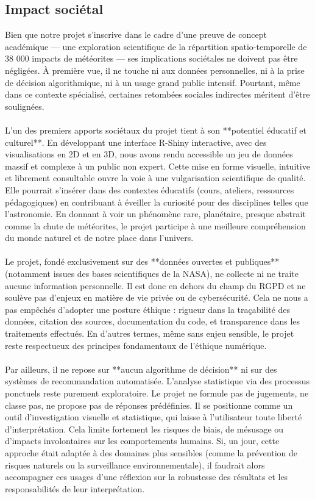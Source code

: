 \documentclass[12pt]{article}
\begin{document}
\subsection{Impact sociétal}
Bien que notre projet s’inscrive dans le cadre d’une preuve de concept académique — une exploration scientifique de la répartition spatio-temporelle de 38 000 impacts de météorites — ses implications sociétales ne doivent pas être négligées. À première vue, il ne touche ni aux données personnelles, ni à la prise de décision algorithmique, ni à un usage grand public intensif. Pourtant, même dans ce contexte spécialisé, certaines retombées sociales indirectes méritent d’être soulignées.\\
\\
L’un des premiers apports sociétaux du projet tient à son **potentiel éducatif et culturel**. En développant une interface R-Shiny interactive, avec des visualisations en 2D et en 3D, nous avons rendu accessible un jeu de données massif et complexe à un public non expert. Cette mise en forme visuelle, intuitive et librement consultable ouvre la voie à une vulgarisation scientifique de qualité. Elle pourrait s’insérer dans des contextes éducatifs (cours, ateliers, ressources pédagogiques) en contribuant à éveiller la curiosité pour des disciplines telles que l’astronomie. En donnant à voir un phénomène rare, planétaire, presque abstrait comme la chute de météorites, le projet participe à une meilleure compréhension du monde naturel et de notre place dans l’univers.\\
\\
Le projet, fondé exclusivement sur des **données ouvertes et publiques** (notamment issues des bases scientifiques de la NASA), ne collecte ni ne traite aucune information personnelle. Il est donc en dehors du champ du RGPD et ne soulève pas d’enjeux en matière de vie privée ou de cybersécurité. Cela ne nous a pas empêchés d’adopter une posture éthique : rigueur dans la traçabilité des données, citation des sources, documentation du code, et transparence dans les traitements effectués. En d’autres termes, même sans enjeu sensible, le projet reste respectueux des principes fondamentaux de l’éthique numérique.\\
\\
Par ailleurs, il ne repose sur **aucun algorithme de décision** ni sur des systèmes de recommandation automatisée. L’analyse statistique via des processus ponctuels reste purement exploratoire. Le projet ne formule pas de jugements, ne classe pas, ne propose pas de réponses prédéfinies. Il se positionne comme un outil d’investigation visuelle et statistique, qui laisse à l’utilisateur toute liberté d’interprétation. Cela limite fortement les risques de biais, de mésusage ou d’impacts involontaires sur les comportements humains. Si, un jour, cette approche était adaptée à des domaines plus sensibles (comme la prévention de risques naturels ou la surveillance environnementale), il faudrait alors accompagner ces usages d’une réflexion sur la robustesse des résultats et les responsabilités de leur interprétation.\\
\end{document}
